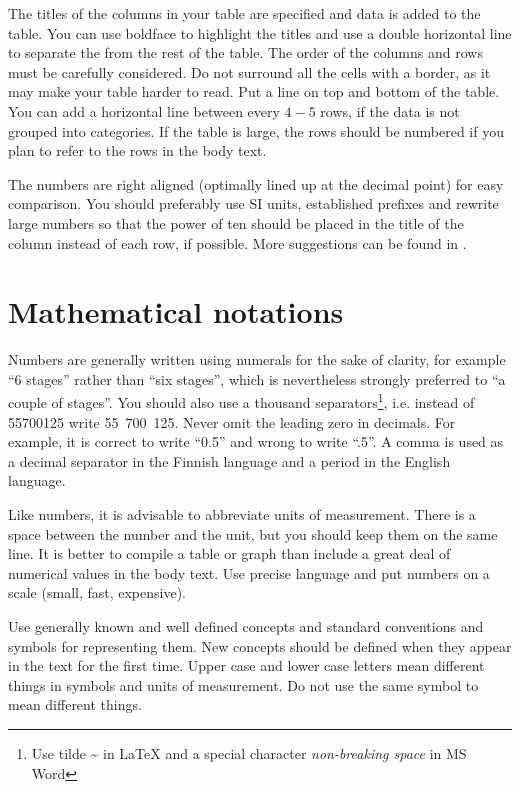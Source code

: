 \documentclass[12pt,a4paper,english
]{tunithesis}
\begin{document}
The titles of the columns in your table are specified and data is
added to the table. You can use boldface to highlight the titles and
use a double horizontal line to separate the from the rest of the
table. The order of the columns and rows must be carefully
considered. Do not surround all the cells with a border, as it may
make your table harder to read. Put a line on top and bottom of the
table. You can add a horizontal line between every $4-5$ rows, if the
data is not grouped into categories. If the table is large, the rows
should be numbered if you plan to refer to the rows in the body text.

The numbers are right aligned (optimally lined up at the decimal
point) for easy comparison. You should preferably use SI units,
established prefixes and rewrite large numbers so that the power of
ten should be placed in the title of the column instead of each row,
if possible. More suggestions can be found in \cite{salminen09}.

\section{Mathematical notations}

Numbers are generally written using numerals for the sake of clarity,
for example ``6 stages'' rather than ``six stages'', which is
nevertheless strongly preferred to ``a couple of stages''. You should
also use a thousand separators\footnote{Use tilde \~{} in LaTeX and a
  special character \textit{non-breaking space} in MS Word},
i.e. instead of 55700125 write 55~700~125. Never omit the leading zero
in decimals. For example, it is correct to write ``0.5'' and wrong to
write ``.5''. A comma is used as a decimal separator in the Finnish
language and a period in the English language.

Like numbers, it is advisable to abbreviate units of
measurement. There is a space between the number and the unit, but you
should keep them on the same line. It is better to compile a table or
graph than include a great deal of numerical values in the body
text. Use precise language and put numbers on a scale (small, fast,
expensive).

Use generally known and well defined concepts and standard conventions
and symbols for representing them. New concepts should be defined when
they appear in the text for the first time. Upper case and lower case
letters mean different things in symbols and units of measurement. Do
not use the same symbol to mean different things.
\end{document}
